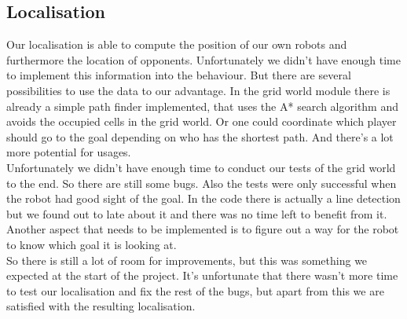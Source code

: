 \documentclass[lnicst,a4paper]{svmultln}
\begin{document}
\subsection{Localisation}
Our localisation is able to compute the position of our own robots and furthermore the location of opponents. Unfortunately we didn't have enough time to implement this information into the behaviour. But there are several possibilities to use the data to our advantage. In the grid world module there is already a simple path finder implemented, that uses the A* search algorithm and avoids the occupied cells in the grid world. Or one could coordinate which player should go to the goal depending on who has the shortest path. And there's a lot more potential for usages.
\\
Unfortunately we didn't have enough time to conduct our tests of the grid world to the end. So there are still some bugs. Also the tests were only successful when the robot had good sight of the goal. In the code there is actually a line detection but we found out to late about it and there was no time left to benefit from it. Another aspect that needs to be implemented is to figure out a way for the robot to know which goal it is looking at.
\\
So there is still a lot of room for improvements, but this was something we expected at the start of the project. It's unfortunate that there wasn't more time to test our localisation and fix the rest of the bugs, but apart from this we are satisfied with the resulting localisation.
\end{document}
